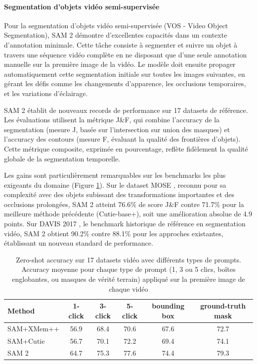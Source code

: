 \paragraph{Segmentation d'objets vidéo semi-supervisée}
Pour la segmentation d'objets vidéo semi-supervisée (VOS - Video Object Segmentation), SAM 2 démontre d'excellentes capacités dans un contexte d'annotation minimale. Cette tâche consiste à segmenter et suivre un objet à travers une séquence vidéo complète en ne disposant que d'une seule annotation manuelle sur la première image de la vidéo. Le modèle doit ensuite propager automatiquement cette segmentation initiale sur toutes les images suivantes, en gérant les défis comme les changements d'apparence, les occlusions temporaires, et les variations d'éclairage.

SAM 2 établit de nouveaux records de performance sur 17 datasets de référence. Les évaluations utilisent la métrique J\&F, qui combine l'accuracy de la segmentation (mesure J, basée sur l'intersection sur union des masques) et l'accuracy des contours (mesure F, évaluant la qualité des frontières d'objets). Cette métrique composite, exprimée en pourcentage, reflète fidèlement la qualité globale de la segmentation temporelle.

Les gains sont particulièrement remarquables sur les benchmarks les plus exigeants du domaine (Figure \ref{tab:ch2_sam2_resultats_sam2_vos_zeroshot}). Sur le dataset MOSE \cite{noauthor_mose_nodate}, reconnu pour sa complexité avec des objets subissant des transformations importantes et des occlusions prolongées, SAM 2 atteint 76.6\% de score J\&F contre 71.7\% pour la meilleure méthode précédente (Cutie-base+), soit une amélioration absolue de 4.9 points. Sur DAVIS 2017 \cite{noauthor_davis_nodate}, le benchmark historique de référence en segmentation vidéo, SAM 2 obtient 90.2\% contre 88.1\% pour les approches existantes, établissant un nouveau standard de performance.

\begin{table}[H]
    \centering
    \begin{tabular}{lccccc}
        \hline
        Method & 1-click & 3-click & 5-click & bounding box & ground-truth mask \\
        \hline
        SAM+XMem++ & 56.9 & 68.4 & 70.6 & 67.6 & 72.7 \\
        SAM+Cutie & 56.7 & 70.1 & 72.2 & 69.4 & 74.1 \\
        SAM 2 & 64.7 & 75.3 & 77.6 & 74.4 & 79.3 \\
        \hline
    \end{tabular}
    \caption{Zero-shot accuracy sur 17 datasets vidéo avec différents types de prompts. Accuracy moyenne pour chaque type de prompt (1, 3 ou 5 clics, boîtes englobantes, ou masques de vérité terrain) appliqué sur la première image de chaque vidéo \cite{ravi_sam_2024}}
    \label{tab:ch2_sam2_resultats_sam2_vos_zeroshot}
\end{table}

